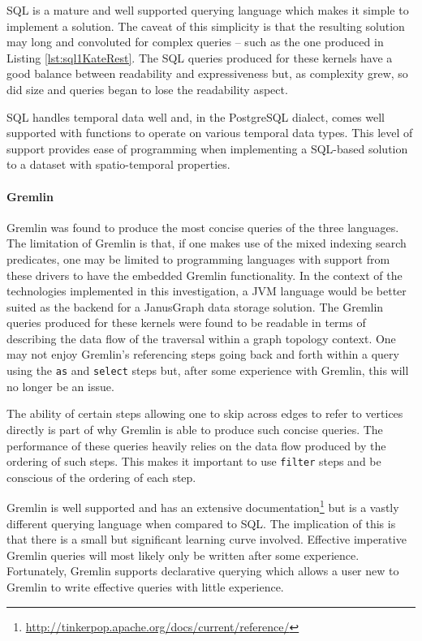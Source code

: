 SQL is a mature and well supported querying language which makes it simple to implement a solution. The caveat of this simplicity is that the resulting solution may long and convoluted for complex queries -- such as the one produced in Listing \ref{lst:sql1KateRest}. The SQL queries produced for these kernels have a good balance between readability and expressiveness but, as complexity grew, so did size and queries began to lose the readability aspect.

SQL handles temporal data well and, in the PostgreSQL dialect, comes well supported with functions to operate on various temporal data types. This level of support provides ease of programming when implementing a SQL-based solution to a dataset with spatio-temporal properties.

\paragraph{Gremlin} 

Gremlin was found to produce the most concise queries of the three languages. The limitation of Gremlin is that, if one makes use of the mixed indexing search predicates, one may be limited to programming languages with support from these drivers to have the embedded Gremlin functionality. In the context of the technologies implemented in this investigation, a JVM language would be better suited as the backend for a JanusGraph data storage solution. The Gremlin queries produced for these kernels were found to be readable in terms of describing the data flow of the traversal within a graph topology context. One may not enjoy Gremlin's referencing steps going back and forth within a query using the \texttt{as} and \texttt{select} steps but, after some experience with Gremlin, this will no longer be an issue.

The ability of certain steps allowing one to skip across edges to refer to vertices directly is part of why Gremlin is able to produce such concise queries. The performance of these queries heavily relies on the data flow produced by the ordering of such steps. This makes it important to use \texttt{filter} steps and be conscious of the ordering of each step.

Gremlin is well supported and has an extensive documentation\footnote{\url{http://tinkerpop.apache.org/docs/current/reference/}} but is a vastly different querying language when compared to SQL. The implication of this is that there is a small but significant learning curve involved. Effective imperative Gremlin queries will most likely only be written after some experience. Fortunately, Gremlin supports declarative querying which allows a user new to Gremlin to write effective queries with little experience.

